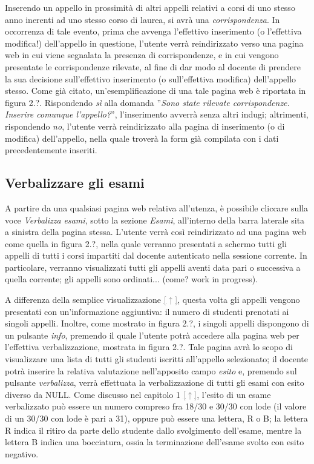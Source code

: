 \documentclass [a4paper,11pt]{book}
\begin{document}
Inserendo un appello in prossimità di altri appelli relativi a corsi di uno stesso anno inerenti ad uno stesso corso di laurea, si avrà una \emph{corrispondenza}. In occorrenza di tale evento, prima che avvenga l'effettivo inserimento (o l'effettiva modifica!) dell'appello in questione, l'utente verrà reindirizzato verso una pagina web in cui viene segnalata la presenza di corrispondenze, e in cui vengono presentate le corrispondenze rilevate, al fine di dar modo al docente di prendere la sua decisione sull'effettivo inserimento (o sull'effettiva modifica) dell'appello stesso. Come già citato, un'esemplificazione di una tale pagina web è riportata in figura 2.?. Rispondendo \emph{sì} alla domanda ''\emph{Sono state rilevate corrispondenze. Inserire comunque l'appello?}'', l'inserimento avverrà senza altri indugi; altrimenti, rispondendo \emph{no}, l'utente verrà reindirizzato alla pagina di inserimento (o di modifica) dell'appello, nella quale troverà la form già compilata con i dati precedentemente inseriti.

\medskip

\subsection{Verbalizzare gli esami}

A partire da una qualsiasi pagina web relativa all'utenza, è possibile cliccare sulla voce \emph{Verbalizza esami}, sotto la sezione \emph{Esami}, all'interno della barra laterale sita a sinistra della pagina stessa. L'utente verrà così reindirizzato ad una pagina web come quella in figura 2.?, nella quale verranno presentati a schermo tutti gli appelli di tutti i corsi impartiti dal docente autenticato nella sessione corrente. In particolare, verranno visualizzati tutti gli appelli aventi data pari o successiva a quella corrente; gli appelli sono ordinati... (come? work in progress).%

A differenza della semplice visualizzazione \hyperref[sec:visualizzaAppelli]{\textcolor{gray}{[$\uparrow$]}}, questa volta gli appelli vengono presentati con un'informazione aggiuntiva: il numero di studenti prenotati ai singoli appelli. Inoltre, come mostrato in figura 2.?, i singoli appelli dispongono di un pulsante \emph{info}, premendo il quale l'utente potrà accedere alla pagina web per l'effettiva verbalizzazione, mostrata in figura 2.?. Tale pagina avrà lo scopo di visualizzare una lista di tutti gli studenti iscritti all'appello selezionato; il docente potrà inserire la relativa valutazione nell'apposito campo \emph{esito} e, premendo sul pulsante \emph{verbalizza}, verrà effettuata la verbalizzazione di tutti gli esami con esito diverso da NULL. Come discusso nel capitolo 1 \hyperref[sec:verb]{\textcolor{gray}{[$\uparrow$]}}, l'esito di un esame verbalizzato può essere un numero compreso fra 18/30 e 30/30 con lode (il valore di un 30/30 con lode è pari a 31), oppure può essere una lettera, R o B; la lettera R indica il ritiro da parte dello studente dallo svolgimento dell'esame, mentre la lettera B indica una bocciatura, ossia la terminazione dell'esame svolto con esito negativo.
\end{document}
